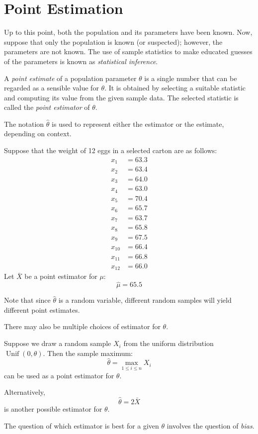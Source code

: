 \documentclass[letterpaper,12pt,fleqn]{article}
\renewcommand{\O}{\theta}
\newcommand{\xb}{\bar{X}}
\newcommand{\m}{\mu}
\DeclareMathOperator{\ud}{Unif}
\begin{document}
\section*{Point Estimation}

Up to this point, both the population and its parameters have been known.  Now, suppose that only the population is known (or
suspected); however, the parameters are not known.  The use of sample statistics to make educated guesses of the parameters is
known as \emph{statistical inference}.

\begin{definition}
  A \emph{point estimate} of a population parameter \(\O\) is a single number that can be regarded as a sensible value for
  \(\O\).  It is obtained by selecting a suitable statistic and computing its value from the given sample data.  The selected
  statistic is called the \emph{point estimator} of \(\O\).

  The notation \(\hat{\O}\) is used to represent either the estimator or the estimate, depending on context.
\end{definition}

\begin{example}
  Suppose that the weight of 12 eggs in a selected carton are as follows:
  \begin{align*}
    x_1 &= 63.3 \\
    x_2 &= 63.4 \\
    x_3 &= 64.0 \\
    x_4 &= 63.0 \\
    x_5 &= 70.4 \\
    x_6 &= 65.7 \\
    x_7 &= 63.7 \\
    x_8 &= 65.8 \\
    x_9 &= 67.5 \\
    x_{10} &= 66.4 \\
    x_{11} &= 66.8 \\
    x_{12} &= 66.0
  \end{align*}
  Let \(\xb\) be a point estimator for \(\m\):
  \[\hat{\m}=65.5\]
\end{example}

Note that since \(\hat{\O}\) is a random variable, different random samples will yield different point estimates.

There may also be multiple choices of estimator for \(\O\).

\begin{example}
  Suppose we draw a random sample \(X_i\) from the uniform distribution \(\ud(0,\O)\).  Then the sample maximum:
  \[\hat{\O}=\max_{1\le i\le n}X_i\]
  can be used as a point estimator for \(\O\).

  Alternatively,
  \[\hat{\O}=2\xb\]
  is another possible estimator for \(\O\).
\end{example}

The question of which estimator is best for a given \(\O\) involves the question of \emph{bias}.
\end{document}
